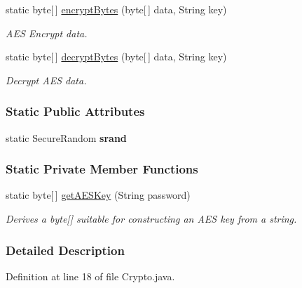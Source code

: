 \begin{DoxyCompactItemize}
static byte\mbox{[}$\,$\mbox{]} \hyperlink{classballmerpeak_1_1turtlenet_1_1server_1_1Crypto_abfc04f2d0f6f92bcca41c53b6cdc667d}{encrypt\-Bytes} (byte\mbox{[}$\,$\mbox{]} data, String key)
\begin{DoxyCompactList}\small\item\em A\-E\-S Encrypt data. \end{DoxyCompactList}\item 
static byte\mbox{[}$\,$\mbox{]} \hyperlink{classballmerpeak_1_1turtlenet_1_1server_1_1Crypto_aea88564254a1c6c217042419f304c1ef}{decrypt\-Bytes} (byte\mbox{[}$\,$\mbox{]} data, String key)
\begin{DoxyCompactList}\small\item\em Decrypt A\-E\-S data. \end{DoxyCompactList}\end{DoxyCompactItemize}
\subsubsection*{Static Public Attributes}
\begin{DoxyCompactItemize}
\item 
static Secure\-Random {\bfseries srand}
\end{DoxyCompactItemize}
\subsubsection*{Static Private Member Functions}
\begin{DoxyCompactItemize}
\item 
static byte\mbox{[}$\,$\mbox{]} \hyperlink{classballmerpeak_1_1turtlenet_1_1server_1_1Crypto_ae27396e1a327d1fc2eba6f7ccd53defc}{get\-A\-E\-S\-Key} (String password)
\begin{DoxyCompactList}\small\item\em Derives a byte\mbox{[}\mbox{]} suitable for constructing an A\-E\-S key from a string. \end{DoxyCompactList}\end{DoxyCompactItemize}


\subsubsection{Detailed Description}


Definition at line 18 of file Crypto.\-java.



